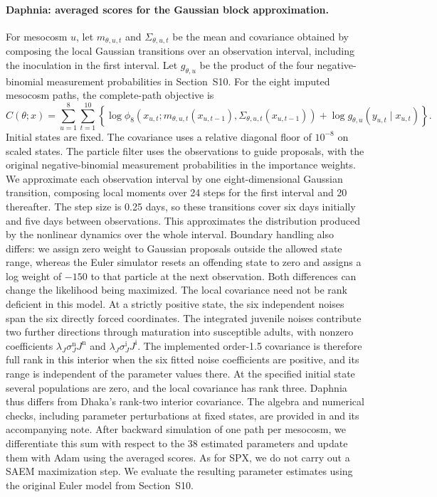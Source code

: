 \documentclass[11pt]{article}
\theoremstyle{thmstylethree}%
\begin{document}
\paragraph{Daphnia: averaged scores for the Gaussian block approximation.}
For mesocosm $u$, let $m_{\theta,u,t}$ and $\Sigma_{\theta,u,t}$ be the
mean and covariance obtained by composing the local Gaussian transitions
over an observation interval, including the inoculation in the first interval.
Let $g_{\theta,u}$ be the product of the four negative-binomial measurement
probabilities in Section~S10.
For the eight imputed mesocosm paths, the complete-path objective is
\begin{equation}
 C(\theta;x)=\sum_{u=1}^{8}\sum_{t=1}^{10}
 \left\{\log\phi_8\!\left(x_{u,t};
 m_{\theta,u,t}(x_{u,t-1}),\Sigma_{\theta,u,t}(x_{u,t-1})\right)
       +\log g_{\theta,u}(y_{u,t}\mid x_{u,t})\right\}.
 \label{eq:benchmark-daphnia-score-objective}
\end{equation}
Initial states are fixed. The covariance uses a relative diagonal floor
of $10^{-8}$ on scaled states. The particle filter uses the observations
to guide proposals, with the original negative-binomial measurement
probabilities in the importance weights.
We approximate each observation interval by one eight-dimensional
Gaussian transition, composing local moments over 24 steps for the first
interval and 20 thereafter. The step size is 0.25 days, so these
transitions cover six days initially and five days between observations.
This approximates the distribution produced by the nonlinear dynamics
over the whole interval. Boundary handling also differs: we assign zero
weight to Gaussian proposals outside the allowed state range, whereas
the Euler simulator resets an offending state to zero and assigns a
log weight of $-150$ to that particle at the next observation.
Both differences can change the likelihood being maximized.
The local covariance need not be rank deficient in this model.
At a strictly positive state, the six independent noises span the six
directly forced coordinates. The integrated juvenile noises contribute
two further directions through maturation into susceptible adults, with
nonzero coefficients $\lambda_J\sigma_J^{\mathrm n}J^{\mathrm n}$ and
$\lambda_J\sigma_J^{\mathrm i}J^{\mathrm i}$.
The implemented order-1.5 covariance is therefore full rank in this
interior when the six fitted noise coefficients are positive, and its
range is independent of the parameter values there. At the specified
initial state several populations are zero, and the local covariance has
rank three. Daphnia thus differs from Dhaka's rank-two interior covariance.
The algebra and numerical checks, including parameter perturbations at
fixed states, are provided in 
and its accompanying note.
After backward simulation of one path per mesocosm, we differentiate this
sum with respect to the 38 estimated parameters and update them with
Adam using the averaged scores. As for SPX, we do not carry out a SAEM
maximization step. We evaluate the resulting parameter estimates using
the original Euler model from Section~S10.
\end{document}
